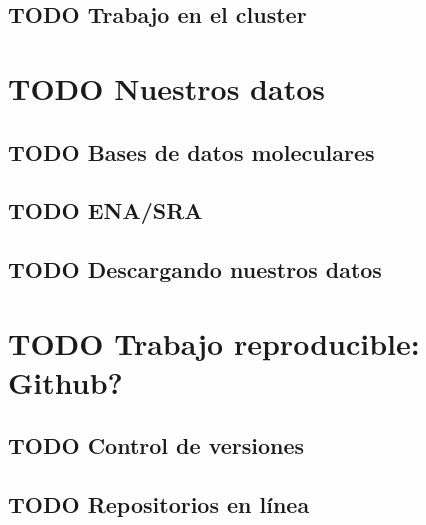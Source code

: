 \documentclass[11pt]{article}
\begin{document}
\subsection{{\bfseries\sffamily TODO} Trabajo en el cluster}
\label{sec:org031c997}
\section{{\bfseries\sffamily TODO} Nuestros datos}
\label{sec:org83cc230}
\subsection{{\bfseries\sffamily TODO} Bases de datos moleculares}
\label{sec:org533af1d}
\subsection{{\bfseries\sffamily TODO} ENA/SRA}
\label{sec:orga5f9070}
\subsection{{\bfseries\sffamily TODO} Descargando nuestros datos}
\label{sec:org6b66d13}
\section{{\bfseries\sffamily TODO} Trabajo reproducible: Github?}
\label{sec:org193b85a}
\subsection{{\bfseries\sffamily TODO} Control de versiones}
\label{sec:orgc59bcf2}
\subsection{{\bfseries\sffamily TODO} Repositorios en línea}
\label{sec:org93b1230}
\end{document}
